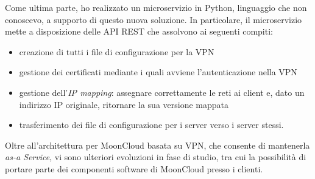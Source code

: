 \documentclass[10pt,a4paper]{article}
\begin{document}
        Come ultima parte, ho realizzato un microservizio in Python, linguaggio che non conoscevo,
        a supporto di questo nuova soluzione.
        In particolare, il microservizio mette a disposizione delle API REST che
        assolvono ai seguenti compiti:
        \begin{itemize}
            \item creazione di tutti i file di configurazione per la VPN
            \item gestione dei certificati mediante i quali avviene l'autenticazione
            nella VPN
            \item gestione dell'\textit{IP mapping}: assegnare correttamente le reti
            ai client e, dato un indirizzo IP originale, ritornare la sua versione mappata
            \item trasferimento dei file di configurazione per i server verso i server stessi.
        \end{itemize}


        Oltre all'architettura per MoonCloud basata su VPN, che consente di mantenerla
        \textit{as-a Service}, vi sono ulteriori evoluzioni in fase di studio, tra cui
        la possibilità di portare parte dei componenti software di MoonCloud presso i clienti.

    
\end{document}
